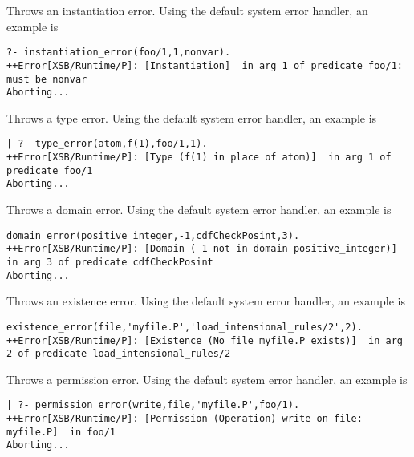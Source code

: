 \begin{description}
Throws an instantiation error.  Using the default system error
handler, an example is 
{\small 
\begin{verbatim}
?- instantiation_error(foo/1,1,nonvar).
++Error[XSB/Runtime/P]: [Instantiation]  in arg 1 of predicate foo/1: must be nonvar
Aborting...
\end{verbatim}
}

Throws a type error.  Using the default system error
handler, an example is 
{\small 
\begin{verbatim}
| ?- type_error(atom,f(1),foo/1,1).
++Error[XSB/Runtime/P]: [Type (f(1) in place of atom)]  in arg 1 of predicate foo/1
Aborting...
\end{verbatim}
}

Throws a domain error.  Using the default system error
handler, an example is 
{\small 
\begin{verbatim}
domain_error(positive_integer,-1,cdfCheckPosint,3).
++Error[XSB/Runtime/P]: [Domain (-1 not in domain positive_integer)]  in arg 3 of predicate cdfCheckPosint
Aborting...
\end{verbatim}
}

Throws an existence error.  Using the default system error
handler, an example is 
{\small 
\begin{verbatim}
existence_error(file,'myfile.P','load_intensional_rules/2',2).
++Error[XSB/Runtime/P]: [Existence (No file myfile.P exists)]  in arg 2 of predicate load_intensional_rules/2
\end{verbatim}
}

Throws a permission error.  Using the default system error
handler, an example is 
{\small 
\begin{verbatim}
| ?- permission_error(write,file,'myfile.P',foo/1).
++Error[XSB/Runtime/P]: [Permission (Operation) write on file: myfile.P]  in foo/1
Aborting...
\end{verbatim}
}



\end{description}
